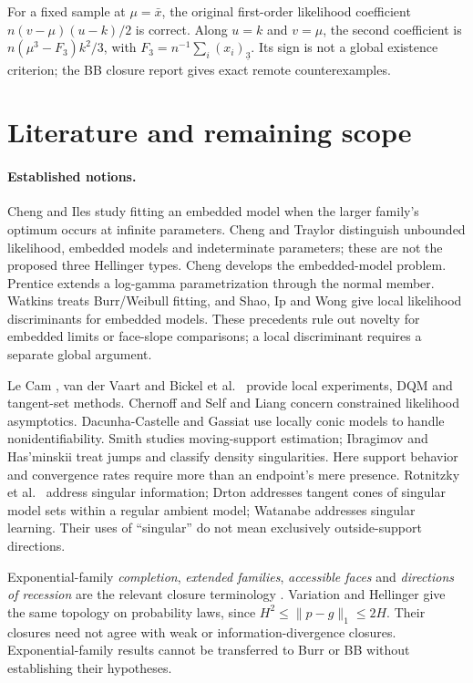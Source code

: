 \documentclass[11pt]{article}
\theoremstyle{definition}
\theoremstyle{remark}
\begin{document}
For a fixed sample at $\mu=\bar x$, the original first-order likelihood
coefficient $n(v-\mu)(u-k)/2$ is correct. Along $u=k$ and $v=\mu$, the second
coefficient is $n(\mu^3-F_3)k^2/3$, with
$F_3=n^{-1}\sum_i(x_i)_{\underline3}$. Its sign is not a global existence
criterion; the BB closure report gives exact remote counterexamples.

\section{Literature and remaining scope}\label{sec:open}
\paragraph{Established notions.}
Cheng and Iles \cite{chengiles} study fitting an embedded model when the
larger family's optimum occurs at infinite parameters. Cheng and Traylor
\cite{chengtraylor} distinguish unbounded likelihood, embedded models and
indeterminate parameters; these are not the proposed three Hellinger types.
Cheng \cite[Chapters 5--7]{chengbook} develops the embedded-model problem.
Prentice \cite{prentice} extends a log-gamma parametrization through the
normal member. Watkins \cite{watkins} treats Burr/Weibull fitting, and Shao,
Ip and Wong \cite{shao} give local likelihood discriminants for embedded
models. These precedents rule out novelty for embedded limits or face-slope
comparisons; a local discriminant requires a separate global argument.

Le Cam \cite{lecam}, van der Vaart \cite[Chapters 7, 16, 25]{vdv} and Bickel
et al.\ \cite{bkrw} provide local experiments, DQM and tangent-set methods.
Chernoff \cite{chernoff} and Self and Liang \cite{selfliang} concern
constrained likelihood asymptotics. Dacunha-Castelle and Gassiat \cite{dcg}
use locally conic models to handle nonidentifiability. Smith \cite{smith}
studies moving-support estimation; Ibragimov and Has'minskii
\cite[Chapters V--VI]{ih} treat jumps and classify density singularities.
Here support behavior and convergence rates require more than an endpoint's
mere presence. Rotnitzky et al.\ \cite{rcbr} address singular information;
Drton \cite{drton} addresses tangent cones of singular model sets within a
regular ambient model; Watanabe \cite{watanabe} addresses singular learning.
Their uses of ``singular'' do not mean exclusively outside-support directions.

Exponential-family \emph{completion}, \emph{extended families},
\emph{accessible faces} and \emph{directions of recession} are the relevant
closure terminology \cite{bn,brown,cm,geyer}. Variation and Hellinger give
the same topology on probability laws, since
$H^2\le\|p-g\|_1\le2H$. Their closures need not agree with weak or
information-divergence closures. Exponential-family results cannot be
transferred to Burr or BB without establishing their hypotheses.
\end{document}
